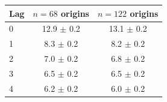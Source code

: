 \begin{tabular}{lcc}
\toprule
Lag & $n=68$ origins & $n=122$ origins \\
\midrule
0 & 12.9 $\pm$ 0.2 & 13.1 $\pm$ 0.2 \\
1 & 8.3 $\pm$ 0.2 & 8.2 $\pm$ 0.2 \\
2 & 7.0 $\pm$ 0.2 & 6.8 $\pm$ 0.2 \\
3 & 6.5 $\pm$ 0.2 & 6.5 $\pm$ 0.2 \\
4 & 6.2 $\pm$ 0.2 & 6.0 $\pm$ 0.2 \\
\bottomrule
\end{tabular}
